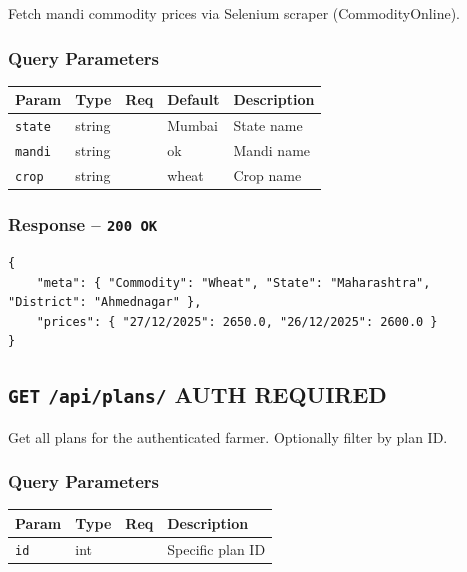 \documentclass[11pt,a4paper]{article}
\newcommand{\authbadge}{\textcolor{lockgold}{\textbf{AUTH REQUIRED}}}
\newcommand{\httpmethod}[1]{\texttt{\textbf{#1}}}
\begin{document}
Fetch mandi commodity prices via Selenium scraper (CommodityOnline).

\subsubsection*{Query Parameters}

\begin{table}[H]
\centering
\begin{tabular}{l l c l l}
\toprule
\textbf{Param} & \textbf{Type} & \textbf{Req} & \textbf{Default} & \textbf{Description} \\
\midrule
\texttt{state} & string & & Mumbai  & State name \\
\texttt{mandi} & string & & ok      & Mandi name \\
\texttt{crop}  & string & & wheat   & Crop name \\
\bottomrule
\end{tabular}
\end{table}

\subsubsection*{Response -- \texttt{200 OK}}
\begin{lstlisting}[style=jsonStyle]
{
    "meta": { "Commodity": "Wheat", "State": "Maharashtra", "District": "Ahmednagar" },
    "prices": { "27/12/2025": 2650.0, "26/12/2025": 2600.0 }
}
\end{lstlisting}

\subsection{\httpmethod{GET} \texttt{/api/plans/} \hfill \authbadge}

Get all plans for the authenticated farmer. Optionally filter by plan ID.

\subsubsection*{Query Parameters}

\begin{table}[H]
\centering
\begin{tabular}{l l c l}
\toprule
\textbf{Param} & \textbf{Type} & \textbf{Req} & \textbf{Description} \\
\midrule
\texttt{id} & int & & Specific plan ID \\
\bottomrule
\end{tabular}
\end{table}
\end{document}
